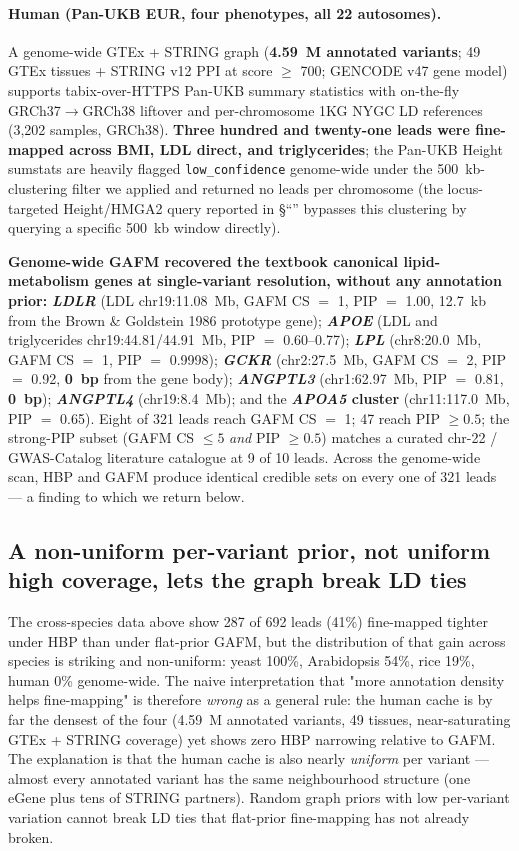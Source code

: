 \paragraph{Human (Pan-UKB EUR, four phenotypes, all 22 autosomes).}
A genome-wide GTEx + STRING graph (\textbf{4.59~M annotated
variants}; 49 GTEx tissues + STRING v12 PPI at score $\geq$ 700;
GENCODE v47 gene model) supports tabix-over-HTTPS Pan-UKB summary
statistics with on-the-fly GRCh37$\to$GRCh38 liftover and per-chromosome
1KG NYGC LD references (3{,}202 samples, GRCh38). \textbf{Three
hundred and twenty-one leads were fine-mapped across BMI, LDL
direct, and triglycerides}; the Pan-UKB Height sumstats are heavily
flagged \texttt{low\_confidence} genome-wide under the
500~kb-clustering filter we applied and returned no leads per
chromosome (the locus-targeted Height/HMGA2 query reported in
\S``'' bypasses this clustering by querying a specific
500~kb window directly).

\textbf{Genome-wide GAFM recovered the textbook canonical
lipid-metabolism genes at single-variant resolution, without any
annotation prior:} \textbf{\emph{LDLR}} (LDL chr19:11.08~Mb, GAFM
CS $=$ 1, PIP $=$ 1.00, 12.7~kb from the Brown \& Goldstein 1986
prototype gene); \textbf{\emph{APOE}} (LDL and triglycerides
chr19:44.81/44.91~Mb, PIP $=$ 0.60--0.77);
\textbf{\emph{LPL}} (chr8:20.0~Mb, GAFM CS $=$ 1, PIP $=$ 0.9998);
\textbf{\emph{GCKR}} (chr2:27.5~Mb, GAFM CS $=$ 2, PIP $=$ 0.92,
\textbf{0~bp} from the gene body); \textbf{\emph{ANGPTL3}}
(chr1:62.97~Mb, PIP $=$ 0.81, \textbf{0~bp});
\textbf{\emph{ANGPTL4}} (chr19:8.4~Mb); and the
\textbf{\emph{APOA5} cluster} (chr11:117.0~Mb, PIP $=$ 0.65). Eight of
321 leads reach GAFM CS $=$ 1; 47 reach PIP $\geq 0.5$;
the strong-PIP subset (GAFM CS $\leq 5$ \emph{and} PIP $\geq 0.5$)
matches a curated chr-22 / GWAS-Catalog literature catalogue at 9 of
10 leads. Across the genome-wide scan, HBP and GAFM produce identical
credible sets on every one of 321 leads --- a finding to which we
return below.

\subsection*{A non-uniform per-variant prior, not uniform high coverage, lets the graph break LD ties}
\label{sec:heterogeneity}

The cross-species data above show 287 of 692 leads (41\%)
fine-mapped tighter under HBP than under flat-prior GAFM, but the
distribution of that gain across species is striking and
non-uniform: yeast 100\%, Arabidopsis 54\%, rice 19\%, human 0\%
genome-wide. The naive interpretation that "more annotation density
helps fine-mapping" is therefore \emph{wrong} as a general rule:
the human cache is by far the densest of the four (4.59~M
annotated variants, 49 tissues, near-saturating GTEx + STRING
coverage) yet shows zero HBP narrowing relative to GAFM. The
explanation is that the human cache is also nearly \emph{uniform}
per variant --- almost every annotated variant has the same
neighbourhood structure (one eGene plus tens of STRING partners).
Random graph priors with low per-variant variation cannot break
LD ties that flat-prior fine-mapping has not already broken.

